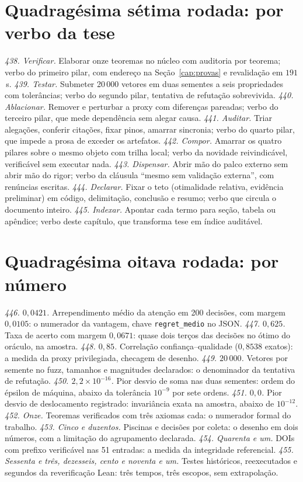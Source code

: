 \section{Quadragésima sétima rodada: por verbo da tese}
\textit{438. Verificar.} Elaborar onze teoremas no núcleo com auditoria por teorema; verbo do primeiro pilar, com endereço na Seção~\ref{cap:provas} e revalidação em $191$\,s.
\textit{439. Testar.} Submeter 20\,000 vetores em duas sementes a seis propriedades com tolerâncias; verbo do segundo pilar, tentativa de refutação sobrevivida.
\textit{440. Ablacionar.} Remover e perturbar a proxy com diferenças pareadas; verbo do terceiro pilar, que mede dependência sem alegar causa.
\textit{441. Auditar.} Triar alegações, conferir citações, fixar pinos, amarrar sincronia; verbo do quarto pilar, que impede a prosa de exceder os artefatos.
\textit{442. Compor.} Amarrar os quatro pilares sobre o mesmo objeto com trilha local; verbo da novidade reivindicável, verificável sem executar nada.
\textit{443. Dispensar.} Abrir mão do palco externo sem abrir mão do rigor; verbo da cláusula ``mesmo sem validação externa'', com renúncias escritas.
\textit{444. Declarar.} Fixar o teto (otimalidade relativa, evidência preliminar) em código, delimitação, conclusão e resumo; verbo que circula o documento inteiro.
\textit{445. Indexar.} Apontar cada termo para seção, tabela ou apêndice; verbo deste capítulo, que transforma tese em índice auditável.
\section{Quadragésima oitava rodada: por número}
\textit{446. $0{,}0421$.} Arrependimento médio da atenção em 200 decisões, com margem $0{,}0105$: o numerador da vantagem, chave \texttt{regret\_medio} no JSON.
\textit{447. $0{,}625$.} Taxa de acerto com margem $0{,}0671$: quase dois terços das decisões no ótimo do oráculo, na amostra.
\textit{448. $0{,}85$.} Correlação confiança--qualidade ($0{,}8538$ exatos): a medida da proxy privilegiada, checagem de desenho.
\textit{449. $20\,000$.} Vetores por semente no fuzz, tamanhos e magnitudes declarados: o denominador da tentativa de refutação.
\textit{450. $2{,}2\times10^{-16}$.} Pior desvio de soma nas duas sementes: ordem do épsilon de máquina, abaixo da tolerância $10^{-9}$ por sete ordens.
\textit{451. $0{,}0$.} Pior desvio de deslocamento registrado: invariância exata na amostra, abaixo de $10^{-12}$.
\textit{452. Onze.} Teoremas verificados com três axiomas cada: o numerador formal do trabalho.
\textit{453. Cinco e duzentos.} Piscinas e decisões por coleta: o desenho em dois números, com a limitação do agrupamento declarada.
\textit{454. Quarenta e um.} DOIs com prefixo verificável nas 51 entradas: a medida da integridade referencial.
\textit{455. Sessenta e três, dezesseis, cento e noventa e um.} Testes históricos, reexecutados e segundos da reverificação Lean: três tempos, três escopos, sem extrapolação.
